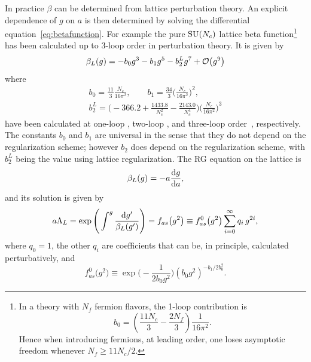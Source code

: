 In practice $\beta$ can be determined
from lattice perturbation theory. An explicit dependence of $g$ on $a$ is then
determined by solving the differential equation~\eqref{eq:betafunction}. 
For example the pure $\operatorname{SU}(N_c)$ lattice beta function\footnote{In a theory
with $N_f$ fermion flavors, the 1-loop contribution is
$$
  b_0=\left(\frac{11N_c}{3}-\frac{2N_f}{3}\right)\frac{1}{16\pi^2}.
$$
Hence when introducing fermions, at leading order, one loses asymptotic freedom
whenever $N_f\geq 11N_c/2$.} has been calculated 
up to 3-loop order in perturbation theory. It is given by
\begin{equation}\label{eq:blatgs}
  \beta_L(g)=-b_0g^3-b_1g^5-b_2^Lg^7+\order{g^{9}}
\end{equation}
where
\begin{equation}\label{eq:blat3loop}\begin{gathered}
  b_{0}= \frac{11}{3}\frac{N_c}{16\pi^2}, \qquad
  b_{1}= \frac{34}{3}\Bigg(\frac{N_c}{16\pi^2}\Bigg)^{2},\\
  b_{2}^{L}=\Bigg(-366.2+\frac{1433.8}{N_c^2}-\frac{2143.0}{N_c^4}\Bigg)
            \Bigg(\frac{N_c}{16\pi^2}\Bigg)^{3}
\end{gathered}\end{equation}
have been calculated at one-loop 
\cite{gross_d.j._ultraviolet_1973,politzer_reliable_1973}, two-loop 
\cite{belavin_calculation_1974,caswell_asymptotic_1974,jones_two-loop_1974},
and three-loop order~\cite{alle_three-loop_1997}, respectively.
The constants $b_0$ and $b_1$ are universal in the sense that they do not 
depend on the regularization scheme; however $b_2$ does depend on the
regularization scheme, with $b_2^L$ being the value using lattice
regularization. The RG equation on the lattice is
\begin{equation}
  \beta_{L}(g)=-a\dv{g}{a},
\end{equation}
and its solution is given by
\begin{equation}\label{eq:latRGEsoln}
  a\Lambda_{L}
   =\exp\Bigg(\int^g\frac{\dd g'}{\beta_{L}(g')}\Bigg) \\
   =f_{as}\big(g^2\big)
   \equiv f_{as}^0\big(g^2\big)\sum\limits_{i=0}^{\infty}
     q_i\,g^{2i},
\end{equation}
where $q_0=1$, the other $q_i$ are coefficients that can be, in 
principle, calculated perturbatively, and
\begin{equation}\label{eq:f0}
   f_{as}^0\big(g^2\big)\equiv\exp\Bigg(-\frac{1}{2b_{0}g^2}\Bigg)
    (b_{0}g^{2})^{-b_{1}/2b_{0}^{2}}.
\end{equation}
